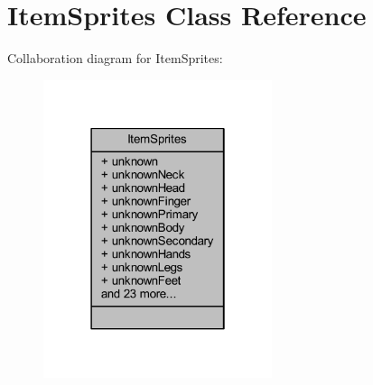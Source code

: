 \hypertarget{class_item_sprites}{}\section{Item\+Sprites Class Reference}
\label{class_item_sprites}


Collaboration diagram for Item\+Sprites\+:\nopagebreak
\begin{figure}[H]
\begin{center}
\leavevmode
\includegraphics[width=190pt]{class_item_sprites__coll__graph}
\end{center}
\end{figure}
